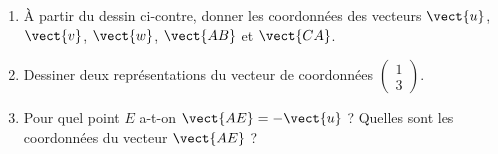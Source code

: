 
\begin{exercice}\label{exosmath-0103}

    \begin{multicols}{2}
        \begin{enumerate}
            \item
                À partir du dessin ci-contre, donner les coordonnées des vecteurs \( \vect{ u }\), \( \vect{ v }\), \( \vect{ w }\), \( \vect{ AB }\) et \( \vect{ CA }\).
            \item
                Dessiner deux représentations du vecteur de coordonnées \( \begin{pmatrix}
                    1    \\ 
                    3    
                \end{pmatrix}\).

            \item
                Pour quel point \( E\) a-t-on \( \vect{ AE }=-\vect{ u }\) ? Quelles sont les coordonnées du vecteur \( \vect{ AE }\) ?
             
        \end{enumerate}
        \columnbreak

        \begin{center}

        \end{center}
    \end{multicols}


\end{exercice}
